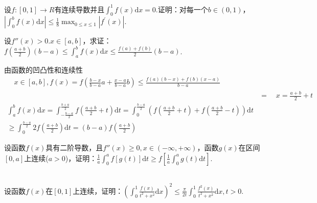 \begin{xiti}
\item 设$f :[0,1] \rightarrow R$有连续导数并且$\int_{0}^{1} f(x) \mathrm{d} x=0$.证明：对每一个$b\in (0,1)$，$\left|\int_{0}^{b} f(x) \mathrm{d} x\right| \leqslant \frac{1}{8} \max _{0 \leqslant x \leqslant 1}\left|f^{\prime}(x)\right|$.
\item 设$f''(x)>0.x\in [a,b]$，求证：$f\left(\frac{a+b}{2}\right)(b-a) \leqslant \int_{a}^{b} f(x) \mathrm{d} x \leqslant \frac{f(a)+f(b)}{2}(b-a)$.
	\begin{solution}
		由函数的凹凸性和连续性
	\begin{align*}
		 \quad x\in[a,b] ,f(x)=f(\frac{b-x}{b-a} a+\frac{x-a}{b-a} b) \le \frac{f(a)(b-x)+f(b)(x-a)}{b-a} \\
		&=\quad x=\frac{a+b}{2}+t \\
		\int_{a}^{b} f(x) \mathrm{d}x =\int_{-\frac{b-a}{2}}^{\frac{b+a}{2}} f(\frac{a+b}{2} +t)\mathrm{d}t=\int_{0}^{\frac{b-a}{2}} (f(\frac{a+b}{2}+t) +f(\frac{a+b}{2}-t))\mathrm{d}t\\
		\ge \int_{0}^{\frac{b-a}{2}} 2f(\frac{a+b}{2}) \mathrm{d}t=(b-a)f(\frac{a+b}{2})
		\end{align*}
	\end{solution}

\item 设函数$f(x)$具有二阶导数，且$f''(x)\geq 0,x\in (-\infty,+\infty)$，函数$g(x)$在区间$[0,a]$上连续($a>0$)，证明：$\frac{1}{a} \int_{0}^{a} f[g(t)] \mathrm{d} t \geqslant f\left[\frac{1}{a} \int_{0}^{a} g(t) \mathrm{d} t\right]$.
\begin{solution}
		\begin{align*}
		\end{align*}
	\end{solution}


\item 设函数$f(x)$在$[0,1]$上连续，证明：$\left(\int_{0}^{1} \frac{f(x)}{t^{2}+x^{2}} \mathrm{d} x\right)^{2} \leqslant \frac{\pi}{2 t} \int_{0}^{1} \frac{f^{2}(x)}{t^{2}+x^{2}} \mathrm{d} x, t>0$.
	\begin{solution}
		\begin{align*}
		\end{align*}
	\end{solution}



\end{xiti}
